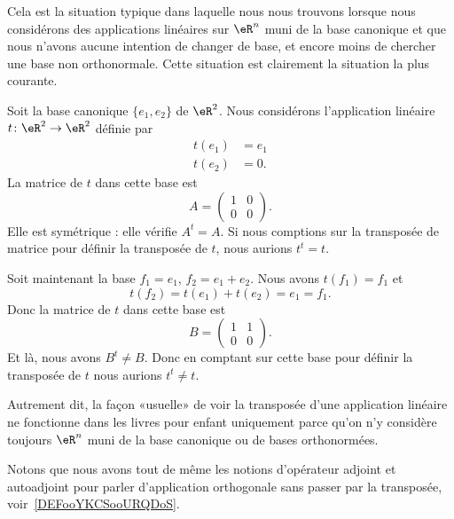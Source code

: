 Cela est la situation typique dans laquelle nous nous trouvons lorsque nous considérons des applications linéaires sur \( \eR^n\) muni de la base canonique et que nous n'avons aucune intention de changer de base, et encore moins de chercher une base non orthonormale. Cette situation est clairement la situation la plus courante.

\begin{example}
    Soit la base canonique \( \{ e_1,e_2 \}\) de \( \eR^2\). Nous considérons l'application linéaire \( t\colon \eR^2\to \eR^2\) définie par
    \begin{subequations}
        \begin{align}
            t(e_1)&=e_1\\
            t(e_2)&=0.
        \end{align}
    \end{subequations}
    La matrice de \( t\) dans cette base est
    \begin{equation}
        A=\begin{pmatrix}
            1    &   0    \\
            0    &   0
        \end{pmatrix}.
    \end{equation}
    Elle est symétrique : elle vérifie \( A^t=A\). Si nous comptions sur la transposée de matrice pour définir la transposée de \( t\), nous aurions \( t^t=t\).

    Soit maintenant la base \( f_1=e_1\), \( f_2=e_1+e_2\). Nous avons \( t(f_1)=f_1\) et
    \begin{equation}
        t(f_2)=t(e_1)+t(e_2)=e_1=f_1.
    \end{equation}
    Donc la matrice de \( t\) dans cette base est
    \begin{equation}
        B=\begin{pmatrix}
            1    &   1    \\
            0    &   0
        \end{pmatrix}.
    \end{equation}
    Et là, nous avons \( B^t\neq B\). Donc en comptant sur cette base pour définir la transposée de \( t\) nous aurions \( t^t\neq t\).
\end{example}

\begin{normaltext}      \label{NooMZVRooExWVKJ}
    Autrement dit, la façon «usuelle» de voir la transposée d'une application linéaire ne fonctionne dans les livres pour enfant uniquement parce qu'on n'y considère toujours \( \eR^n\) muni de la base canonique ou de bases orthonormées.

    Notons que nous avons tout de même les notions d'opérateur adjoint et autoadjoint pour parler d'application orthogonale sans passer par la transposée, voir~\ref{DEFooYKCSooURQDoS}.
\end{normaltext}

